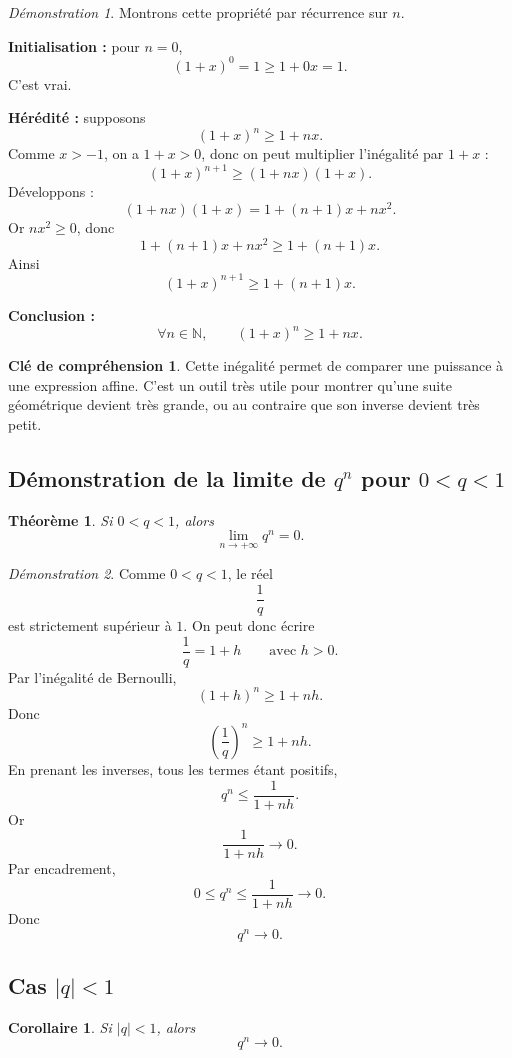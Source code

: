 \documentclass[11pt,a4paper]{article}
\theoremstyle{definition}
\newtheorem{interpretation}[definition]{Clé de compréhension}
\theoremstyle{plain}
\newtheorem{theoreme}[definition]{Théorème}
\newtheorem{corollaire}[definition]{Corollaire}
\theoremstyle{remark}
\newtheorem*{demonstrationlibre}{Démonstration}
\newcommand{\N}{\mathbb{N}}
\begin{document}
\begin{demonstrationlibre}
Montrons cette propriété par récurrence sur $n$.

\textbf{Initialisation :} pour $n=0$,
\[
(1+x)^0=1\geq1+0x=1.
\]
C'est vrai.

\textbf{Hérédité :} supposons
\[
(1+x)^n\geq1+nx.
\]
Comme $x>-1$, on a $1+x>0$, donc on peut multiplier l'inégalité par $1+x$ :
\[
(1+x)^{n+1}\geq(1+nx)(1+x).
\]
Développons :
\[
(1+nx)(1+x)=1+(n+1)x+nx^2.
\]
Or $nx^2\geq0$, donc
\[
1+(n+1)x+nx^2\geq1+(n+1)x.
\]
Ainsi
\[
(1+x)^{n+1}\geq1+(n+1)x.
\]

\textbf{Conclusion :}
\[
\forall n\in\N,\qquad (1+x)^n\geq1+nx.
\]
\end{demonstrationlibre}

\begin{interpretation}
Cette inégalité permet de comparer une puissance à une expression affine. C'est un outil très utile pour montrer qu'une suite géométrique devient très grande, ou au contraire que son inverse devient très petit.
\end{interpretation}

\subsection{Démonstration de la limite de \(q^n\) pour \(0<q<1\)}

\begin{theoreme}
Si $0<q<1$, alors
\[
\lim_{n\to+\infty}q^n=0.
\]
\end{theoreme}

\begin{demonstrationlibre}
Comme $0<q<1$, le réel
\[
\frac1q
\]
est strictement supérieur à $1$. On peut donc écrire
\[
\frac1q=1+h
\qquad \text{avec } h>0.
\]
Par l'inégalité de Bernoulli,
\[
(1+h)^n\geq1+nh.
\]
Donc
\[
\left(\frac1q\right)^n\geq1+nh.
\]
En prenant les inverses, tous les termes étant positifs,
\[
q^n\leq \frac1{1+nh}.
\]
Or
\[
\frac1{1+nh}\longrightarrow0.
\]
Par encadrement,
\[
0\leq q^n\leq \frac1{1+nh}\longrightarrow0.
\]
Donc
\[
q^n\longrightarrow0.
\]
\end{demonstrationlibre}

\subsection{Cas \(|q|<1\)}

\begin{corollaire}
Si $|q|<1$, alors
\[
q^n\longrightarrow0.
\]
\end{corollaire}
\end{document}
